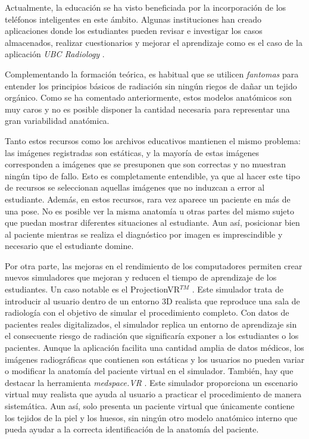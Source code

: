 Actualmente, la educación se ha visto beneficiada por la incorporación de los teléfonos inteligentes en este ámbito. Algunas instituciones han creado aplicaciones donde los estudiantes pueden revisar e investigar los casos almacenados, realizar cuestionarios y mejorar el aprendizaje como es el caso de la aplicación \emph{UBC Radiology} \cite{Spouge2017}. %

Complementando la formación teórica, es habitual que se utilicen \emph{fantomas} para entender los principios básicos de radiación sin ningún riegos de dañar un tejido orgánico. Como se ha comentado anteriormente, estos modelos anatómicos son muy caros y no es posible disponer la cantidad necesaria para representar una gran variabilidad anatómica.

Tanto estos recursos como los archivos educativos mantienen el mismo problema: las imágenes registradas son estáticas, y la mayoría de estas imágenes corresponden a imágenes que se presuponen que son correctas y no muestran ningún tipo de fallo. Esto es completamente entendible, ya que al hacer este tipo de recursos se seleccionan aquellas imágenes que no induzcan a error al estudiante. Además, en estos recursos, rara vez aparece un paciente en más de una pose. No es posible ver la misma anatomía u otras partes del mismo sujeto que puedan mostrar diferentes situaciones al estudiante. Aun así, posicionar bien al paciente mientras se realiza el diagnóstico por imagen es imprescindible y necesario que el estudiante domine. 


Por otra parte, las mejoras en el rendimiento de los computadores permiten crear nuevos simuladores que mejoran y reducen el tiempo de aprendizaje de los estudiantes. Un caso notable es el  ProjectionVR$^{TM}$ \cite{shanahan2016student}. Este simulador trata de introducir al usuario dentro de un entorno 3D realista que reproduce una sala de radiología con el objetivo de simular el procedimiento completo. Con datos de pacientes reales digitalizados, el simulador replica un entorno de aprendizaje sin el consecuente riesgo de radiación que significaría exponer a los estudiantes o los pacientes. Aunque la aplicación facilita una cantidad amplia de datos médicos, los imágenes radiográficas que contienen son estáticas y los usuarios no pueden variar o modificar la anatomía del paciente virtual en el simulador. También, hay que destacar la herramienta \emph{medspace.VR} \cite{medspace}. Este simulador proporciona un escenario virtual muy realista que ayuda al usuario a practicar el procedimiento de manera sistemática. Aun así, solo presenta un paciente virtual que únicamente contiene los tejidos de la piel y los huesos, sin ningún otro modelo anatómico interno que pueda ayudar a la correcta identificación de la anatomía del paciente.


